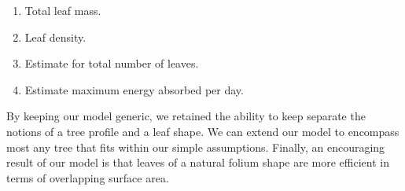 \documentclass[10pt]{article}
\numberwithin{equation}{subsection}
\begin{document}
\begin{enumerate}
\item Total leaf mass.
\item Leaf density.
\item Estimate for total number of leaves.
\item Estimate maximum energy absorbed per day.
\end{enumerate}

By keeping our model generic, we retained the ability to keep separate
the notions of a tree profile and a leaf shape. We can extend our
model to encompass most any tree that fits within our simple
assumptions. Finally, an encouraging result of our model is that
leaves of a natural folium shape are more efficient in terms of
overlapping surface area.


\onecolumn


\nocite{*}
\end{document}
